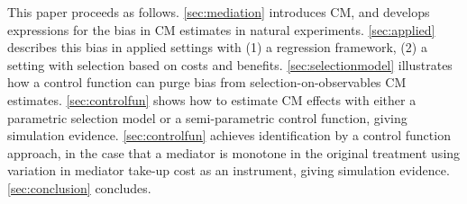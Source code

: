This paper proceeds as follows.
\autoref{sec:mediation} introduces CM, and develops expressions for the bias in CM estimates in natural experiments.
\autoref{sec:applied} describes this bias in applied settings with (1) a regression framework, (2) a setting with selection based on costs and benefits.
\autoref{sec:selectionmodel} illustrates how a control function can purge bias from selection-on-observables CM estimates.
\autoref{sec:controlfun} shows how to estimate CM effects with either a parametric selection model or a semi-parametric control function, giving simulation evidence.
\autoref{sec:controlfun} achieves identification by a control function approach,
in the case that a mediator is monotone in the original treatment using variation in mediator take-up cost as an instrument, giving simulation evidence.
\autoref{sec:conclusion} concludes.

